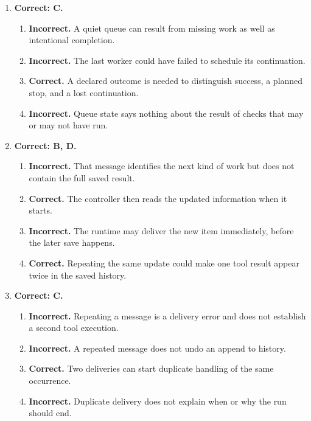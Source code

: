 \begin{enumerate}[start=41,itemsep=0.7\baselineskip]
\item[{\hyperref[exercise:44]{44.}}] \begin{minipage}[t]{\linewidth}
\textbf{Correct: C.}
\begin{enumerate}[label=\textnormal{(\Alph*)},leftmargin=*,itemsep=0pt]
\item \textbf{Incorrect.} A quiet queue can result from missing work as well as intentional completion.
\item \textbf{Incorrect.} The last worker could have failed to schedule its continuation.
\item \textbf{Correct.} A declared outcome is needed to distinguish success, a planned stop, and a lost continuation.
\item \textbf{Incorrect.} Queue state says nothing about the result of checks that may or may not have run.
\end{enumerate}
\end{minipage}

\item[{\hyperref[exercise:45]{45.}}] \begin{minipage}[t]{\linewidth}
\textbf{Correct: B, D.}
\begin{enumerate}[label=\textnormal{(\Alph*)},leftmargin=*,itemsep=0pt]
\item \textbf{Incorrect.} That message identifies the next kind of work but does not contain the full saved result.
\item \textbf{Correct.} The controller then reads the updated information when it starts.
\item \textbf{Incorrect.} The runtime may deliver the new item immediately, before the later save happens.
\item \textbf{Correct.} Repeating the same update could make one tool result appear twice in the saved history.
\end{enumerate}
\end{minipage}

\item[{\hyperref[exercise:46]{46.}}] \begin{minipage}[t]{\linewidth}
\textbf{Correct: C.}
\begin{enumerate}[label=\textnormal{(\Alph*)},leftmargin=*,itemsep=0pt]
\item \textbf{Incorrect.} Repeating a message is a delivery error and does not establish a second tool execution.
\item \textbf{Incorrect.} A repeated message does not undo an append to history.
\item \textbf{Correct.} Two deliveries can start duplicate handling of the same occurrence.
\item \textbf{Incorrect.} Duplicate delivery does not explain when or why the run should end.
\end{enumerate}
\end{minipage}


\end{enumerate}
